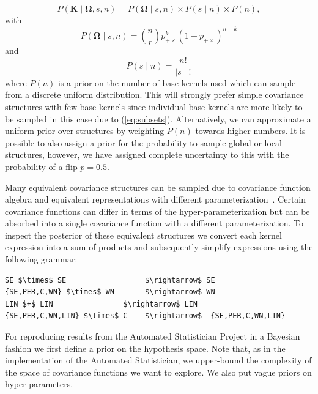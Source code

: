 \documentclass{article} %
\begin{document}
\begin{equation}
P(\mathbf{K} \mid \bm{\Omega},s,n) = P(\bm{\Omega} \mid s,n)\times P(s \mid n) \times P(n),
\end{equation}
with
\begin{equation}
P(\bm{\Omega} \mid s,n)= {n \choose r}  p_{+\times}^k (1 - p_{+\times})^{n-k}
\end{equation}
and
\begin{equation}
\label{eq:subsets}
P(s \mid n) = \frac{n!}{ \mid s \mid !}
\end{equation}
where $P(n)$ is a prior on the number of base kernels used which can sample from a discrete uniform distribution. This will strongly prefer simple covariance structures with few base kernels since individual base kernels are more likely to be sampled in this case due to (\ref{eq:subsets}). Alternatively, we can approximate a uniform prior over structures by weighting $P(n)$ towards higher numbers. It is possible to also assign a prior for the probability to sample global or local structures, however, we have assigned complete uncertainty to this with the probability of a flip $p = 0.5$.



Many equivalent covariance structures can be sampled due to covariance function algebra and equivalent representations with different parameterization~\citep{lloyd2014automatic}. Certain covariance functions can differ in terms of the hyper-parameterization but can be absorbed into a single covariance function with a different parameterization. To inspect the posterior of these equivalent structures we convert each kernel expression into a sum of products and subsequently simplify expressions using the following grammar:
\begin{minipage}{\linewidth}
\scriptsize
\begin{lstlisting}[frame=single,label=alg:simplify,caption=Grammar to simplify expressions,mathescape]
SE $\times$ SE                  $\rightarrow$ SE 
{SE,PER,C,WN} $\times$ WN       $\rightarrow$ WN
LIN $+$ LIN                $\rightarrow$ LIN
{SE,PER,C,WN,LIN} $\times$ C    $\rightarrow$  {SE,PER,C,WN,LIN} 
\end{lstlisting}

\end{minipage}

For reproducing results from the Automated Statistician Project in a Bayesian fashion we first define a prior on the hypothesis space. Note that, as in the implementation of the Automated Statistician, we upper-bound the complexity of the space of covariance functions we want to explore. We also put vague priors on hyper-parameters.
\end{document}
